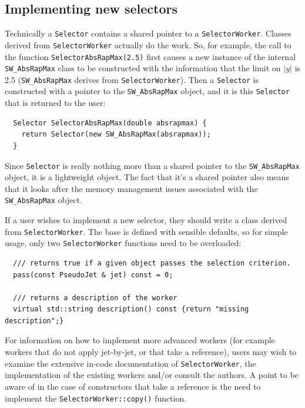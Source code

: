 \documentclass[12pt,a4]{article}
\newcommand{\ttt}[1]{{\small\texttt{#1}}}
\begin{document}
\subsection{Implementing new selectors}
\label{sec:new-selectors}

Technically a \ttt{Selector} contains a shared pointer to a
\ttt{SelectorWorker}.
%
Classes derived from \ttt{SelectorWorker} actually do the work. 
%
So, for example, the call to the function \ttt{SelectorAbsRapMax(2.5)}
first causes a new instance of the internal \ttt{SW\_AbsRapMax} class
to be constructed with the information that the limit on $|y|$
is 2.5 (\ttt{SW\_AbsRapMax} derives from \ttt{SelectorWorker}).
%
Then a \ttt{Selector} is constructed with a pointer to the
\ttt{SW\_AbsRapMax} object, and it is this \ttt{Selector} that is
returned to the user:
%
\begin{lstlisting}
  Selector SelectorAbsRapMax(double absrapmax) {
    return Selector(new SW_AbsRapMax(absrapmax));
  }
\end{lstlisting}
%
Since \ttt{Selector} is really nothing more than a shared pointer to
the \ttt{SW\_AbsRapMax} object, it is a lightweight object. 
%
The fact that it's a shared pointer also means that it looks after
the memory management issues associated with the \ttt{SW\_AbsRapMax}
object. 

If a user wishes to implement a new selector, they should write a
class derived from \ttt{SelectorWorker}.
%
The base is defined with sensible defaults, so for simple usage, only
two \ttt{SelectorWorker} functions need to be overloaded:
\begin{lstlisting}
  /// returns true if a given object passes the selection criterion.
  pass(const PseudoJet & jet) const = 0;

  /// returns a description of the worker
  virtual std::string description() const {return "missing description";}
\end{lstlisting}
For information on how to implement more advanced workers (for example
workers that do not apply jet-by-jet, or that take a reference), users
may wish to examine the extensive in-code documentation of
\ttt{SelectorWorker}, the implementation of the existing workers
and/or consult the authors.
%
A point to be aware of in the case of constructors that take a
reference is the need to implement the \ttt{SelectorWorker::copy()}
function.

\end{document}

